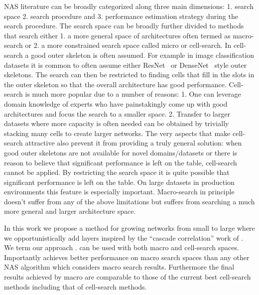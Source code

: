 NAS literature can be broadly categorized along three main dimensions: 1. search space 2. search procedure and 3. performance estimation strategy during the search procedure. The search space can be broadly further divided to methods that search either 1. a more general space of architectures often termed as macro-search or 2. a more constrained search space called micro or cell-search. In cell-search a good outer skeleton is often assumed. For example in image classification datasets it is common to often assume either ResNet~\citep{resnet} or DenseNet~\cite{densenet} style outer skeletons. The search can then be restricted to finding cells that fill in the slots in the outer skeleton so that the overall architecture has good performance. Cell-search is much more popular due to a number of reasons: 1. One can leverage domain knowledge of experts who have painstakingly come up with good architectures and focus the search to a smaller space. 2. Transfer to larger datasets where more capacity is often needed can be obtained by trivially stacking many cells to create larger networks. The very aspects that make cell-search attractive also prevent it from providing a truly general solution: when good outer skeletons are not available for novel domains/datasets or there is reason to believe that significant performance is left on the table, cell-search cannot be applied. By restricting the search space it is quite possible that significant performance is left on the table. On large datasets in production environments this feature is especially important. Macro-search in principle doesn't suffer from any of the above limitations but suffers from searching a much more general and larger architecture space. 

In this work we propose a method for growing networks from small to large where we opportunistically add layers inspired by the ``cascade correlation'' work of \cite{cascadecorr}. We term our approach \Petridish. \Petridish can be used with both macro and cell-search spaces. Importantly \Petridish achieves better performance on macro search spaces than any other NAS algorithm which considers macro search results. Furthermore the final results achieved by \Petridish macro are comparable to those of the current best cell-search methods including that of \Petridish cell-search methods.

